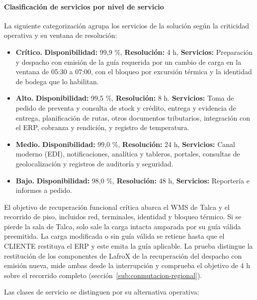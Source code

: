 \paragraph*{Clasificación de servicios por nivel de servicio}
\label{tab:jd05}
La siguiente categorización agrupa los servicios de la solución según la criticidad operativa y su ventana de resolución:
\begin{itemize}
\item \textbf{Crítico.} \textbf{Disponibilidad:} 99,9 \%, \textbf{Resolución:} 4 h, \textbf{Servicios:} Preparación y despacho con emisión de la guía requerida por un cambio de carga en la ventana de 05:30 a 07:00, con el bloqueo por excursión térmica y la identidad de bodega que lo habilitan.
\item \textbf{Alto.} \textbf{Disponibilidad:} 99,5 \%, \textbf{Resolución:} 8 h. \textbf{Servicios:} Toma de pedido de preventa y consulta de stock y crédito, entrega y evidencia de entrega, planificación de rutas, otros documentos tributarios, integración con el ERP, cobranza y rendición, y registro de temperatura.
\item \textbf{Medio.} \textbf{Disponibilidad:} 99,0 \%, \textbf{Resolución:} 24 h, \textbf{Servicios:} Canal moderno (EDI), notificaciones, analítica y tableros, portales, consultas de geolocalización y registros de auditoría y seguridad.
\item \textbf{Bajo.} \textbf{Disponibilidad:} 98,0 \%, \textbf{Resolución:} 48 h, \textbf{Servicios:} Reportería e informes a pedido.
\end{itemize}


El objetivo de recuperación funcional crítica abarca el WMS de Talca y el recorrido de piso, incluidos red, terminales, identidad y bloqueo térmico. Si se pierde la sala de Talca, solo sale la carga intacta amparada por su guía válida preemitida. La carga modificada o sin guía válida se retiene hasta que el CLIENTE restituya el ERP y este emita la guía aplicable. La prueba distingue la restitución de los componentes de LafroX de la recuperación del despacho con emisión nueva, mide ambas desde la interrupción y comprueba el objetivo de 4 h sobre el recorrido completo (sección~\ref{sub:conmutacion-regional}).

Las clases de servicio se distinguen por su alternativa operativa:


